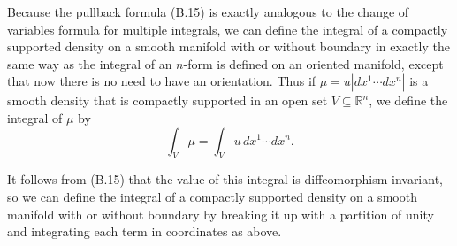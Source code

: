 Because the pullback formula (B.15) is exactly analogous to the change of variables formula for multiple integrals, we can define the integral of a compactly supported density on a smooth manifold with or without boundary in exactly the same way as the integral of an $n$-form is defined on an oriented manifold, except that now there is no need to have an orientation. Thus if $\mu = u |dx^1 \cdots dx^n|$ is a smooth density that is compactly supported in an open set $V \subseteq \mathbb{R}^n$, we define the integral of $\mu$ by
\[
\int_V \mu = \int_V u \, dx^1 \cdots dx^n.
\]

It follows from (B.15) that the value of this integral is diffeomorphism-invariant, so we can define the integral of a compactly supported density on a smooth manifold with or without boundary by breaking it up with a partition of unity and integrating each term in coordinates as above.

